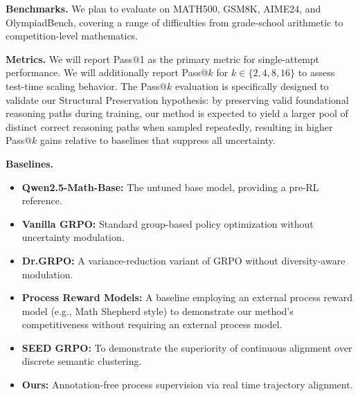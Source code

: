 \documentclass[conference]{IEEEtran}
\begin{document}
\textbf{Benchmarks.} We plan to evaluate on MATH500, GSM8K, AIME24, and OlympiadBench, covering a range of difficulties from grade-school arithmetic to competition-level mathematics.

\textbf{Metrics.} We will report Pass@1 as the primary metric for single-attempt performance. We will additionally report Pass@$k$ for $k \in \{2, 4, 8, 16\}$ to assess test-time scaling behavior. The Pass@$k$ evaluation is specifically designed to validate our Structural Preservation hypothesis: by preserving valid foundational reasoning paths during training, our method is expected to yield a larger pool of distinct correct reasoning paths when sampled repeatedly, resulting in higher Pass@$k$ gains relative to baselines that suppress all uncertainty.

\textbf{Baselines.}
\begin{itemize}
    \item \textbf{Qwen2.5-Math-Base:} The untuned base model, providing a pre-RL reference.
    \item \textbf{Vanilla GRPO:} Standard group-based policy optimization without uncertainty modulation.
    \item \textbf{Dr.GRPO:} A variance-reduction variant of GRPO without diversity-aware modulation.
    \item \textbf{Process Reward Models:} A baseline employing an external process reward model (e.g., Math Shepherd style) to demonstrate our method's competitiveness without requiring an external process model.
    \item \textbf{SEED GRPO:} To demonstrate the superiority of continuous alignment over discrete semantic clustering.
    \item \textbf{Ours:} Annotation-free process supervision via real time trajectory alignment.
\end{itemize}

\begin{table}[htbp]
\centering
\caption{Expected Results on Mathematical Reasoning Benchmarks}
\label{tab:main_results}
\end{table}
\end{document}
